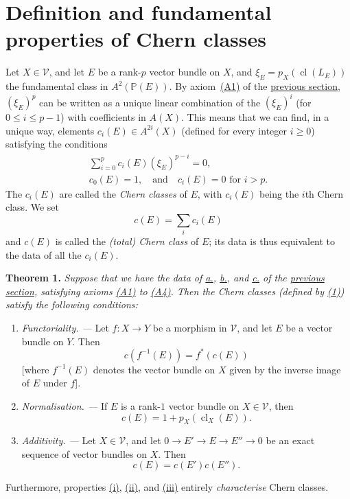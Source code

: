\documentclass{article}
\newenvironment{itenv}[1]
  {\phantomsection\par\medskip\noindent\textbf{#1.}\itshape}
  {\medskip}
\renewcommand{\cal}[1]{{\mathcal{#1}}}
\renewcommand{\geq}{\geqslant}
\renewcommand{\leq}{\leqslant}
\DeclareMathOperator{\cl}{cl}
\begin{document}
\section{Definition and fundamental properties of Chern classes}
\label{section3}

Let $X\in\cal{V}$, and let $E$ be a rank-$p$ vector bundle on $X$, and $\xi_E=p_X(\cl(L_E))$ the fundamental class in $A^2(\mathbb{P}(E))$.
By axiom~\hyperref[axiomA1]{(A1)} of the \hyperref[section2]{previous section}, $(\xi_E)^p$ can be written as a unique linear combination of the $(\xi_E)^i$ (for $0\leq i\leq p-1$) with coefficients in $A(X)$.
This means that we can find, in a unique way, elements $c_i(E)\in A^{2i}(X)$ (defined for every integer $i\geq0$) satisfying the conditions
\[
\label{equation1}
  \begin{gathered}
    \sum_{i=0}^p c_i(E)(\xi_E)^{p-i} = 0,
  \\c_0(E)=1,\quad\text{and}\quad c_i(E)=0\mbox{ for $i>p$.}
  \end{gathered}
\tag{1}
\]
The $c_i(E)$ are called the \emph{Chern classes} of $E$, with $c_i(E)$ being the $i$th Chern class.
We set
\[
\label{equation2}
  c(E) = \sum_i c_i(E)
\tag{2}
\]
and $c(E)$ is called the \emph{(total) Chern class} of $E$;
its data is thus equivalent to the data of all the $c_i(E)$.

\begin{itenv}{Theorem 1}
\label{theorem1}
  Suppose that we have the data of \hyperref[dataa]{\rm{a.}}, \hyperref[datab]{\rm{b.}}, and \hyperref[datac]{\rm{c.}} of the \hyperref[section2]{previous section}, satisfying axioms \hyperref[axiomA1]{\rm{(A1)}} to \hyperref[axiomA4]{\rm{(A4)}}.
  Then the Chern classes (defined by \hyperref[equation1]{(1)}) satisfy the following conditions:
  \begin{enumerate}[\rm(i)]
    \item\label{theorem1i}
      \emph{Functoriality. ---}
      Let $f\colon X\to Y$ be a morphism in $\cal{V}$, and let $E$ be a vector bundle on $Y$.
      Then
      \[
      \label{equation3}
        c(f^{-1}(E)) = f^*(c(E))
      \tag{3}
      \]
      [where $f^{-1}(E)$ denotes the vector bundle on $X$ given by the inverse image of $E$ under $f$].
    \item\label{theorem1ii}
      \emph{Normalisation. ---}
      If $E$ is a rank-$1$ vector bundle on $X\in\cal{V}$, then
      \[
      \label{equation4}
        c(E) = 1+p_X(\cl_X(E)).
      \tag{4}
      \]
    \item\label{theorem1iii}
      \emph{Additivity. ---}
      Let $X\in\cal{V}$, and let $0\to E'\to E\to E''\to 0$ be an exact sequence of vector bundles on $X$.
      Then
      \[
      \label{equation5}
        c(E) = c(E')c(E'').
      \tag{5}
      \]
  \end{enumerate}

  Furthermore, properties \hyperref[theorem1i]{\rm{(i)}}, \hyperref[theorem1ii]{\rm{(ii)}}, and \hyperref[theorem1iii]{\rm{(iii)}} entirely \emph{characterise} Chern classes.
\end{itenv}
\end{document}
